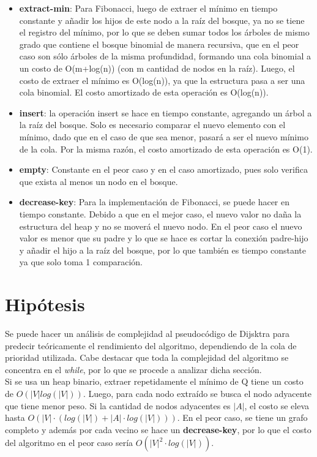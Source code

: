 \documentclass[11pt]{article}
\begin{document}
\begin{itemize}
    \item \textbf{extract-min}: Para Fibonacci, luego de extraer el mínimo en tiempo constante y añadir los hijos de este nodo a la raíz del bosque, ya no se tiene el registro del mínimo, por lo que se deben sumar todos los árboles de mismo grado que contiene el bosque binomial de manera recursiva, que en el peor caso son sólo árboles de la misma profundidad, formando una cola binomial a un costo de O(m+log(n)) (con m cantidad de nodos en la raíz). Luego, el costo de extraer el mínimo es O(log(n)), ya que la estructura pasa a ser una cola binomial. El costo amortizado de esta operación es O(log(n)).
    \item \textbf{insert}: la operación insert se hace en tiempo constante, agregando un árbol a la raíz del bosque. Solo es necesario comparar el nuevo elemento con el mínimo, dado que en el caso de que sea menor, pasará a ser el nuevo mínimo de la cola. Por la misma razón, el costo amortizado de esta operación es O(1).
    \item \textbf{empty}: Constante en el peor caso y en el caso amortizado, pues solo verifica que exista al menos un nodo en el bosque.
    \item \textbf{decrease-key}: Para la implementación de Fibonacci, se puede hacer en tiempo constante. Debido a que en el mejor caso, el nuevo valor no daña la estructura del heap y no se moverá el nuevo nodo. En el peor caso el nuevo valor es menor que su padre y lo que se hace es cortar la conexión padre-hijo y añadir el hijo a la raíz del bosque, por lo que también es tiempo constante ya que solo toma 1 comparación.
\end{itemize}

\newpage

\section{Hipótesis}
Se puede hacer un análisis de complejidad al pseudocódigo de Dijsktra para predecir teóricamente el rendimiento del algoritmo, dependiendo de la cola de prioridad utilizada. Cabe destacar que toda la complejidad del algoritmo se concentra en el \textit{while}, por lo que se procede a analizar dicha sección.
\\

Si se usa un heap binario, extraer repetidamente el mínimo de Q tiene un costo de $O(|V| log(|V|))$. Luego, para cada nodo extraído se busca el nodo adyacente que tiene menor peso. Si la cantidad de nodos adyacentes es $|A|$, el costo se eleva hasta $O(|V| \cdot (log(|V|) + |A| \cdot log(|V|)))$. En el peor caso, se tiene un grafo completo y además por cada vecino se hace un \textbf{decrease-key}, por lo que el costo del algoritmo en el peor caso sería $O(|V|^2 \cdot log(|V|))$. \\
\end{document}
